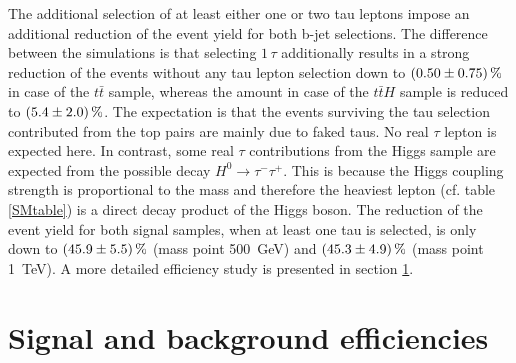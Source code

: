 %
The additional selection of at least either one or two tau leptons impose an additional reduction of the event yield for both b-jet selections. The difference between the simulations is that selecting $1\,\tau$ additionally results in a strong reduction of the events without any tau lepton selection down to $\SI{0.5\pm 0.75}{\percent}$ in case of the $t\bar{t}$ sample, whereas the amount in case of the $t\bar{t}H$ sample is reduced to $\SI{5.4\pm 2.0}{\percent}$. The expectation is that the events surviving the tau selection contributed from the top pairs are mainly due to faked taus. No real $\tau$ lepton is expected here. In contrast, some real $\tau$ contributions from the Higgs sample are expected from the possible decay $H^0\rightarrow \tau^-\tau^+$. This is because the Higgs coupling strength is proportional to the mass and therefore the heaviest lepton (cf. table \ref{SMtable}) is a direct decay product of the Higgs boson. The reduction of the event yield for both signal samples, when at least one tau is selected, is only down to $\SI{45.9\pm 5.5}{\percent}$ (mass point \SI{500}{\giga\electronvolt}) and $\SI{45.3\pm 4.9}{\percent}$ (mass point \SI{1}{\tera\electronvolt}). A more detailed efficiency study is presented in section \ref{signalANDbgEff}.     
\section{Signal and background efficiencies}\label{signalANDbgEff}
